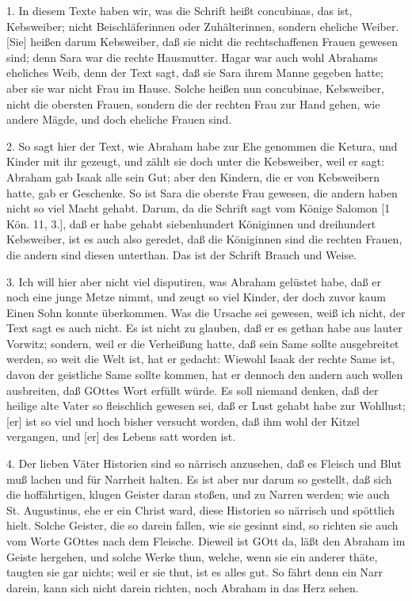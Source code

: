 1. In diesem Texte haben wir, was die Schrift heißt concubinas, das ist, Kebsweiber; nicht Beischläferinnen oder Zuhälterinnen, sondern eheliche Weiber. [Sie] heißen darum Kebsweiber, daß sie nicht die rechtschaffenen Frauen gewesen sind; denn Sara war die rechte Hausmutter. Hagar war auch wohl Abrahams eheliches Weib, denn der Text sagt, daß sie Sara ihrem Manne gegeben hatte; aber sie war nicht Frau im Hause. Solche heißen nun concubinae, Kebsweiber, nicht die obersten Frauen, sondern die der rechten Frau zur Hand gehen, wie andere Mägde, und doch eheliche Frauen sind.

2. So sagt hier der Text, wie Abraham habe zur Ehe genommen die Ketura, und Kinder mit ihr gezeugt, und zählt sie doch unter die Kebsweiber, weil er sagt: Abraham gab Isaak alle sein Gut; aber den Kindern, die er von Kebsweibern hatte, gab er Geschenke. So ist Sara die oberste Frau gewesen, die andern haben nicht so viel Macht gehabt. Darum, da die Schrift sagt vom Könige Salomon [1 Kön. 11, 3.], daß er habe gehabt siebenhundert Königinnen und dreihundert Kebsweiber, ist es auch also geredet, daß die Königinnen sind die rechten Frauen, die andern sind diesen unterthan. Das ist der Schrift Brauch und Weise.

3. Ich will hier aber nicht viel disputiren, was Abraham gelüstet habe, daß er noch eine junge Metze nimmt, und zeugt so viel Kinder, der doch zuvor kaum Einen Sohn konnte überkommen. Was die Ursache sei gewesen, weiß ich nicht, der Text sagt es auch nicht. Es ist nicht zu glauben, daß er es gethan habe aus lauter Vorwitz; sondern, weil er die Verheißung hatte, daß sein Same sollte ausgebreitet werden, so weit die Welt ist, hat er gedacht: Wiewohl Isaak der rechte Same ist, davon der geistliche Same sollte kommen, hat er dennoch den andern auch wollen ausbreiten, daß GOttes Wort erfüllt würde. Es soll niemand denken, daß der heilige alte Vater so fleischlich gewesen sei, daß er Lust gehabt habe zur Wohllust; [er] ist so viel und hoch bisher versucht worden, daß ihm wohl der Kitzel vergangen, und [er] des Lebens satt worden ist.

4. Der lieben Väter Historien sind so närrisch anzusehen, daß es Fleisch und Blut muß lachen und für Narrheit halten. Es ist aber nur darum so gestellt, daß sich die hoffährtigen, klugen Geister daran stoßen, und zu Narren werden; wie auch St. Augustinus, ehe er ein Christ ward, diese Historien so närrisch und spöttlich hielt. Solche Geister, die so darein fallen, wie sie gesinnt sind, so richten sie auch vom Worte GOttes nach dem Fleische. Dieweil ist GOtt da, läßt den Abraham im Geiste hergehen, und solche Werke thun, welche, wenn sie ein anderer thäte, taugten sie gar nichts; weil er sie thut, ist es alles gut. So fährt denn ein Narr darein, kann sich nicht darein richten, noch Abraham in das Herz sehen.

